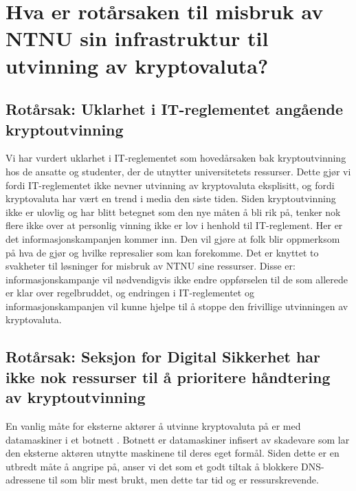 \section{Hva er rotårsaken til misbruk av NTNU sin infrastruktur til utvinning av kryptovaluta?}
\subsection*{Rotårsak: Uklarhet i IT-reglementet angående kryptoutvinning}
Vi har vurdert uklarhet i IT-reglementet som hovedårsaken bak kryptoutvinning hos de ansatte og studenter, der de utnytter universitetets ressurser. Dette gjør vi fordi IT-reglementet ikke nevner utvinning av kryptovaluta eksplisitt, og fordi kryptovaluta har vært en trend i media den siste tiden. Siden kryptoutvinning ikke er ulovlig og har blitt betegnet som den nye måten å bli rik på, tenker nok flere ikke over at personlig vinning ikke er lov i henhold til IT-reglement. Her er det informasjonskampanjen kommer inn. Den vil gjøre at folk blir oppmerksom på hva de gjør og hvilke represalier som kan forekomme. Det er knyttet to svakheter til løsninger for misbruk av NTNU sine ressurser. Disse er: informasjonskampanje vil nødvendigvis ikke endre oppførselen til de som allerede er klar over regelbruddet, og endringen i IT-reglementet og informasjonskampanjen vil kunne hjelpe til å stoppe den frivillige utvinningen av kryptovaluta.


\subsection*{Rotårsak: Seksjon for Digital Sikkerhet har ikke nok ressurser til å prioritere håndtering av kryptoutvinning}
En vanlig måte for eksterne aktører å utvinne kryptovaluta på er med datamaskiner i et botnett \cite{Botnet}. Botnett er datamaskiner infisert av skadevare som lar den eksterne aktøren utnytte maskinene til deres eget formål. Siden dette er en utbredt måte å angripe på, anser vi det som et godt tiltak å blokkere DNS-adressene til som blir mest brukt, men dette tar tid og er ressurskrevende.



